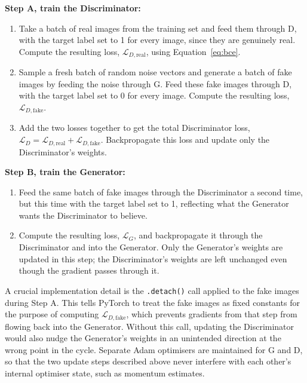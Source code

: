 \documentclass[12pt,a4paper]{article}
\begin{document}
\textbf{Step A, train the Discriminator:}
\begin{enumerate}
    \item Take a batch of real images from the training set and feed them through D,
          with the target label set to 1 for every image, since they are genuinely real.
          Compute the resulting loss, $\mathcal{L}_{D,\text{real}}$, using
          Equation~\ref{eq:bce}.
    \item Sample a fresh batch of random noise vectors and generate a batch of fake
          images by feeding the noise through G. Feed these fake images through D, with
          the target label set to 0 for every image. Compute the resulting loss,
          $\mathcal{L}_{D,\text{fake}}$.
    \item Add the two losses together to get the total Discriminator loss,
          $\mathcal{L}_D = \mathcal{L}_{D,\text{real}} + \mathcal{L}_{D,\text{fake}}$.
          Backpropagate this loss and update only the Discriminator's weights.
\end{enumerate}

\textbf{Step B, train the Generator:}
\begin{enumerate}
    \item Feed the same batch of fake images through the Discriminator a second time,
          but this time with the target label set to 1, reflecting what the Generator
          wants the Discriminator to believe.
    \item Compute the resulting loss, $\mathcal{L}_G$, and backpropagate it through the
          Discriminator and into the Generator. Only the Generator's weights are updated
          in this step; the Discriminator's weights are left unchanged even though the
          gradient passes through it.
\end{enumerate}

A crucial implementation detail is the \texttt{.detach()} call applied to the fake images
during Step A. This tells PyTorch to treat the fake images as fixed constants for the
purpose of computing $\mathcal{L}_{D,\text{fake}}$, which prevents gradients from that
step from flowing back into the Generator. Without this call, updating the Discriminator
would also nudge the Generator's weights in an unintended direction at the wrong point in
the cycle. Separate Adam optimisers are maintained for G and D, so that the two update
steps described above never interfere with each other's internal optimiser state, such as
momentum estimates.
\end{document}
